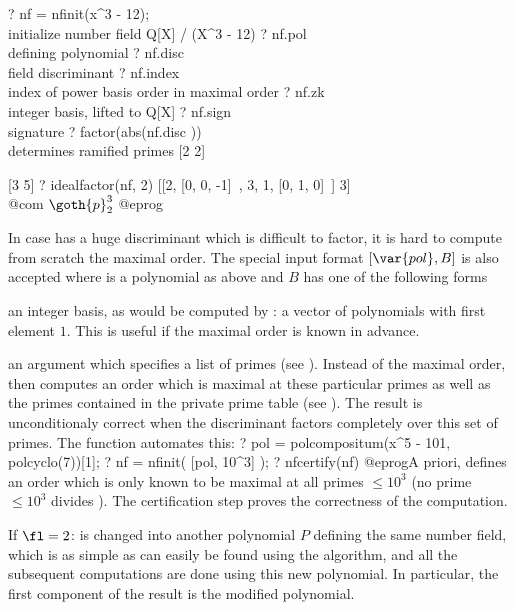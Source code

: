 \bprog
? nf = nfinit(x^3 - 12); \\ initialize number field Q[X] / (X^3 - 12)
? nf.pol   \\ defining polynomial
? nf.disc  \\ field discriminant
? nf.index \\ index of power basis order in maximal order
? nf.zk    \\ integer basis, lifted to Q[X]
? nf.sign  \\ signature
? factor(abs(nf.disc ))  \\ determines ramified primes
[2 2]

[3 5]
? idealfactor(nf, 2)
[[2, [0, 0, -1]~, 3, 1, [0, 1, 0]~] 3]  \\ @com $\goth{p}_2^3$
@eprog


In case  has a huge discriminant which is difficult to factor,
it is hard to compute from scratch the maximal order. The special input
format $[\var{pol}, B]$ is also accepted where  is a polynomial as
above and $B$ has one of the following forms

\item an integer basis, as would be computed by : a vector of
polynomials with first element $1$. This is useful if the maximal order is
known in advance.

\item an argument  which specifies a list of primes (see
). Instead of the maximal order,  then computes an
order which is maximal at these particular primes as well as the primes
contained in the private prime table (see ). The result is
unconditionaly correct when the discriminant  factors
completely over this set of primes. The function  automates
this:
\bprog
? pol = polcompositum(x^5 - 101, polcyclo(7))[1];
? nf = nfinit( [pol, 10^3] );
? nfcertify(nf)
@eprog\noindent A priori,  defines an order which is only known
to be maximal at all primes $\leq 10^3$ (no prime $\leq 10^3$ divides
). The certification step proves the correctness of the
computation.
\medskip

If $\fl=2$:  is changed into another polynomial $P$ defining the same
number field, which is as simple as can easily be found using the
 algorithm, and all the subsequent computations are done
using this new polynomial. In particular, the first component of the result
is the modified polynomial.

